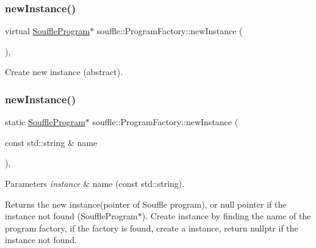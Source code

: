 \subsubsection{\texorpdfstring{new\+Instance()}{newInstance()}\hspace{0.1cm}{\footnotesize\ttfamily [1/2]}}
{\footnotesize\ttfamily virtual \hyperlink{classsouffle_1_1_souffle_program}{Souffle\+Program}$\ast$ souffle\+::\+Program\+Factory\+::new\+Instance (\begin{DoxyParamCaption}{ }\end{DoxyParamCaption})\hspace{0.3cm}{\ttfamily [protected]}, {}}

Create new instance (abstract). \mbox{\label{classsouffle_1_1_program_factory_a195f94a860a7fc1ba823074070e10fe2}} 
\subsubsection{\texorpdfstring{new\+Instance()}{newInstance()}\hspace{0.1cm}{\footnotesize\ttfamily [2/2]}}
{\footnotesize\ttfamily static \hyperlink{classsouffle_1_1_souffle_program}{Souffle\+Program}$\ast$ souffle\+::\+Program\+Factory\+::new\+Instance (\begin{DoxyParamCaption}\item[{const std\+::string \&}]{name }\end{DoxyParamCaption})\hspace{0.3cm}{\ttfamily [inline]}, {\ttfamily [static]}}


\begin{DoxyParams}{Parameters}
{\em instance} & name (const std\+::string). \\
\hline
\end{DoxyParams}
\begin{DoxyReturn}{Returns}
the new instance(pointer of Souffle program), or null pointer if the instance not found (Souffle\+Program$\ast$). Create instance by finding the name of the program factory, if the factory is found, create a instance, return nullptr if the instance not found. 
\end{DoxyReturn}
\mbox{\label{classsouffle_1_1_program_factory_a460cdf1db973dad0daba7b936a741826}} 
